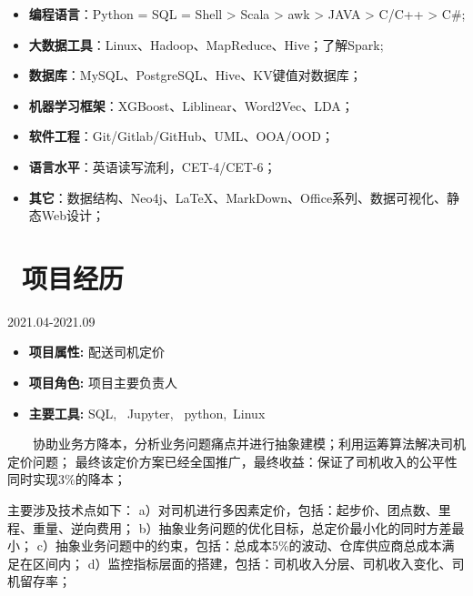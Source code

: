 \documentclass{resume}
\begin{document}
\begin{itemize}  [parsep=0.5ex]

   \item   \textbf{编程语言}：Python = SQL = Shell > Scala > awk > JAVA > C/C++ > C\#;
   \item    \textbf{大数据工具}：Linux、Hadoop、MapReduce、Hive；了解Spark;
   \item    \textbf{数据库}：MySQL、PostgreSQL、Hive、KV键值对数据库；
   \item    \textbf{机器学习框架}：XGBoost、Liblinear、Word2Vec、LDA；
   \item    \textbf{软件工程}：Git/Gitlab/GitHub、UML、OOA/OOD；
   \item    \textbf{语言水平}：英语读写流利，CET-4/CET-6；
   \item    \textbf{其它}：数据结构、Neo4j、LaTeX、MarkDown、Office系列、数据可视化、静态Web设计；
 
\end{itemize}

\medskip


















\section{   \faUsers    \ 项目经历}






                      {2021.04-2021.09}

\begin{itemize}  [parsep=0.5ex]

  \item   \textbf{  项目属性:  }   {  配送司机定价  }                
  \item   \textbf{  项目角色:  }   {  项目主要负责人  }
  \item   \textbf{  主要工具:  }   {  SQL, \ Jupyter, \ python,\ Linux }

\end{itemize}


{    \ \ \ \ 协助业务方降本，分析业务问题痛点并进行抽象建模；利用运筹算法解决司机定价问题；
最终该定价方案已经全国推广，最终收益：保证了司机收入的公平性同时实现3\%的降本；

主要涉及技术点如下：
a）对司机进行多因素定价，包括：起步价、团点数、里程、重量、逆向费用；
b）抽象业务问题的优化目标，总定价最小化的同时方差最小；
c）抽象业务问题中的约束，包括：总成本5\%的波动、仓库供应商总成本满足在区间内；
d）监控指标层面的搭建，包括：司机收入分层、司机收入变化、司机留存率；
}
\end{document}
